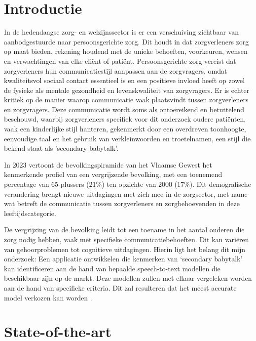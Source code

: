 
\section{Introductie}%
\label{sec:introductie}

In de hedendaagse zorg- en welzijnssector is er een verschuiving zichtbaar van aanbodgestuurde naar persoonsgerichte zorg. Dit houdt in dat zorgverleners zorg op maat bieden, rekening houdend met de unieke behoeften, voorkeuren, wensen en verwachtingen van elke cliënt of patiënt. Persoonsgerichte zorg vereist dat zorgverleners hun communicatiestijl aanpassen aan de zorgvragers, omdat kwaliteitsvol sociaal contact essentieel is en een positieve invloed heeft op zowel de fysieke als mentale gezondheid en levenskwaliteit van zorgvragers.
Er is echter kritiek op de manier waarop communicatie vaak plaatsvindt tussen zorgverleners en zorgvragers. Deze communicatie wordt soms als ontoereikend en betuttelend beschouwd, waarbij zorgverleners specifiek voor dit onderzoek oudere patiënten, vaak een kinderlijke stijl hanteren, gekenmerkt door een overdreven toonhoogte, eenvoudige taal en het gebruik van verkleinwoorden en troetelnamen, een stijl die bekend staat als 'secondary babytalk'.

In 2023 vertoont de bevolkingspiramide van het Vlaamse Gewest het kenmerkende profiel van een vergrijzende bevolking, met een toenemend percentage van 65-plussers (21\%) ten opzichte van 2000 (17\%). Dit demografische verandering brengt nieuwe uitdagingen met zich mee in de zorgsector, met name wat betreft de communicatie tussen zorgverleners en zorgbehoevenden in deze leeftijdscategorie.

De vergrijzing van de bevolking leidt tot een toename in het aantal ouderen die zorg nodig hebben, vaak met specifieke communicatiebehoeften. Dit kan variëren van gehoorproblemen tot cognitieve uitdagingen. Hierin ligt het belang dit mijn onderzoek: Een applicatie ontwikkelen die kenmerken van ‘secondary babytalk’ kan identificeren aan de hand van bepaalde speech-to-text modellen die beschikbaar zijn op de markt. Deze modellen zullen met elkaar vergeleken worden aan de hand van specifieke criteria. Dit zal resulteren dat het meest accurate model verkozen kan worden
\textcite{Vlaanderen.be}.


\section{State-of-the-art}%
\label{sec:state-of-the-art}

